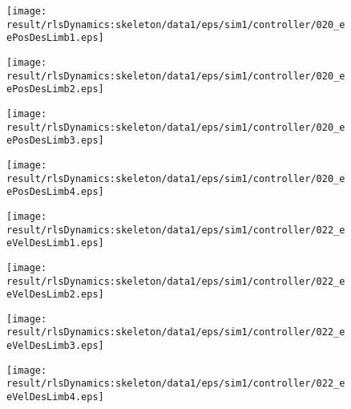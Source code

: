 \begin{figure}[h]
\centering
\begin{minipage}{0.24\linewidth}
\centering
\texttt{[image: \\result/rlsDynamics:skeleton/data1/eps/sim1/controller/020\_eePosDesLimb1.eps]}
\par\footnotesize{}
\end{minipage}
\begin{minipage}{0.24\linewidth}
\centering
\texttt{[image: \\result/rlsDynamics:skeleton/data1/eps/sim1/controller/020\_eePosDesLimb2.eps]}
\par\footnotesize{}
\end{minipage}
\begin{minipage}{0.24\linewidth}
\centering
\texttt{[image: \\result/rlsDynamics:skeleton/data1/eps/sim1/controller/020\_eePosDesLimb3.eps]}
\par\footnotesize{}
\end{minipage}
\begin{minipage}{0.24\linewidth}
\centering
\texttt{[image: \\result/rlsDynamics:skeleton/data1/eps/sim1/controller/020\_eePosDesLimb4.eps]}
\par\footnotesize{}
\end{minipage}
\begin{minipage}{0.24\linewidth}
\centering
\texttt{[image: \\result/rlsDynamics:skeleton/data1/eps/sim1/controller/022\_eeVelDesLimb1.eps]}
\par\footnotesize{}
\end{minipage}
\begin{minipage}{0.24\linewidth}
\centering
\texttt{[image: \\result/rlsDynamics:skeleton/data1/eps/sim1/controller/022\_eeVelDesLimb2.eps]}
\par\footnotesize{}
\end{minipage}
\begin{minipage}{0.24\linewidth}
\centering
\texttt{[image: \\result/rlsDynamics:skeleton/data1/eps/sim1/controller/022\_eeVelDesLimb3.eps]}
\par\footnotesize{}
\end{minipage}
\begin{minipage}{0.24\linewidth}
\centering
\texttt{[image: \\result/rlsDynamics:skeleton/data1/eps/sim1/controller/022\_eeVelDesLimb4.eps]}
\par\footnotesize{}
\end{minipage}
\begin{minipage}{0.24\linewidth}

\end{minipage}
\end{figure}
